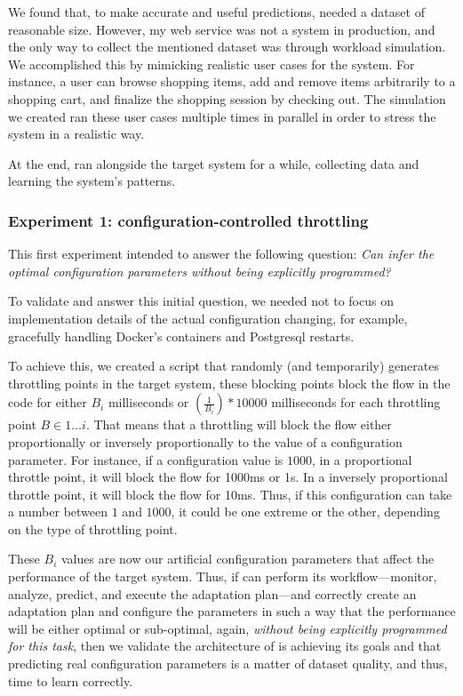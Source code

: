 We found that, to make accurate and useful predictions, \projectname{} needed a dataset of reasonable size. However, my web service was not a system in production, and the only way to collect the mentioned dataset was through workload simulation. We accomplished this by mimicking realistic user cases for the system. For instance, a user can browse shopping items, add and remove  items arbitrarily to a shopping cart, and finalize the shopping session by checking out. The simulation we created ran these user cases multiple times in parallel in order to stress the system in a realistic way. 

At the end, \projectname{} ran alongside the target system for a while, collecting data and learning the system's patterns.


\subsubsection{Experiment 1: configuration-controlled throttling}

This first experiment intended to answer the following question: \emph{Can \projectname{} infer the optimal configuration parameters without being explicitly programmed?}

To validate and answer this initial question, we needed not to focus on implementation details of the actual configuration changing, for example, gracefully handling Docker's containers and Postgresql restarts.

To achieve this, we created a script that randomly (and temporarily) generates throttling points in the target system, these blocking points block the flow in the code for either $B_i$ milliseconds or $(\frac{1}{B_i}) * 10000$ milliseconds for each throttling point $B \in 1 \dots i$. That means that a throttling will block the flow either proportionally or inversely proportionally to the value of a configuration parameter. For instance, if a configuration value is $1000$, in a proportional throttle point, it will block the flow for 1000ms or 1s. In a inversely proportional throttle point, it will block the flow for 10ms. Thus, if this configuration can take a number between $1$ and $1000$, it could be one extreme or the other, depending on the type of throttling point.

These $B_i$ values are now our artificial configuration parameters that affect the performance of the target system. Thus, if \projectname{} can perform its workflow---monitor, analyze, predict, and execute the adaptation plan---and correctly create an adaptation plan and configure the parameters in such a way that the performance will be either optimal or sub-optimal, again, \emph{without being explicitly programmed for this task}, then we validate the architecture of \projectname{} is achieving its goals and that predicting real configuration parameters is a matter of dataset quality, and thus, time to learn correctly.

